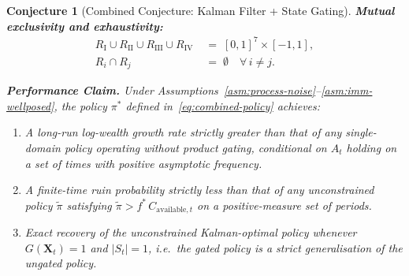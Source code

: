 \documentclass[12pt,openany]{book}
\numberwithin{equation}{chapter}
\theoremstyle{plain}
\newtheorem{conjecture}[theorem]{Conjecture}
\theoremstyle{definition}
\theoremstyle{remark}
\def\mathcal#1{#1}%
\begin{document}
\begin{conjecture}[Combined Conjecture: Kalman Filter + State Gating]
\noindent\textbf{Mutual exclusivity and exhaustivity:}
\begin{align}
  \mathcal{R}_{\mathrm{I}} \cup \mathcal{R}_{\mathrm{II}}
  \cup \mathcal{R}_{\mathrm{III}} \cup \mathcal{R}_{\mathrm{IV}}
  &\;=\; [0,1]^7 \times [-1,1],
  \label{eq:regime-partition-union} \\
  \mathcal{R}_i \cap \mathcal{R}_j
  &\;=\; \emptyset \quad \forall\, i \neq j.
  \label{eq:regime-partition-disjoint}
\end{align}

\medskip
\noindent\textbf{Performance Claim.}
Under Assumptions~\ref{asm:process-noise}--\ref{asm:imm-wellposed},
the policy $\pi^*$ defined in~\eqref{eq:combined-policy}
achieves:
\begin{enumerate}
  \item A long-run log-wealth growth rate strictly greater than
        that of any single-domain policy operating without
        product gating, conditional on $\mathcal{A}_t$ holding
        on a set of times with positive asymptotic frequency.

  \item A finite-time ruin probability strictly less than that
        of any unconstrained policy $\tilde{\pi}$ satisfying
        $\tilde{\pi} > f^*\,C_{\mathrm{available},t}$ on a
        positive-measure set of periods.

  \item Exact recovery of the unconstrained Kalman-optimal
        policy whenever $G(\mathbf{X}_t) = 1$ and
        $|S_t| = 1$, i.e.\ the gated policy is a strict
        generalisation of the ungated policy.
\end{enumerate}
\end{conjecture}
\end{document}
